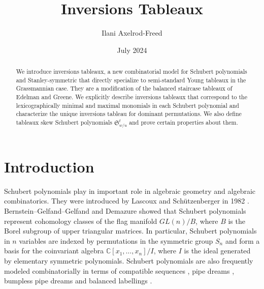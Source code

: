 \documentclass{article}
\title{Inversions Tableaux}
\author{Ilani Axelrod-Freed}
\date{July 2024}
\theoremstyle{definition}
\begin{document}
\newcommand{\Inv}{\mathrm{Inv}}
\newcommand{\IT}{\mathcal{IT}}
\newcommand{\RP}{\mathcal{RP}}
\newcommand{\ID}[1]{\mathcal{ID}_{#1}}

\maketitle

\begin{abstract}
We introduce inversions tableaux, a new combinatorial model for Schubert polynomials and Stanley-symmetric that directly specialize to semi-standard Young tableaux in the Grassmannian case. 
They are a modification of the balanced staircase tableaux of Edelman and Greene. We explicitly describe inversions tableaux that correspond to the lexicographically minimal and maximal monomials in each Schubert polynomial and characterize the unique inversions tableau for dominant permutations. 
We also define tableaux skew Schubert polynomials $\mathfrak{S}^t_{w/u}$ and prove certain properties about them.



\end{abstract}

\section{Introduction}

Schubert polynomials play in important role in algebraic geometry and algebraic combinatorics. They were introduced by Lascoux and Schützenberger in 1982 \cite{LascouxS}. Bernstein--Gelfand--Gelfand \cite{bernstein1973schubert} and Demazure \cite{demazure1974} showed that Schubert polynomials represent cohomology classes of the flag manifold $GL(n)/B$, where $B$ is the Borel subgroup of upper triangular matrices. In particular, Schubert polynomials in $n$ variables are indexed by permutations in the symmetric group $S_n$ and form a basis for the coinvariant algebra $\mathbb{C}[x_1, \dots, x_n]/I$, where $I$ is the ideal generated by elementary symmetric polynomials. Schubert polynomials are also frequently modeled combinatorially in terms of compatible sequences \cite{billey1993some, FOMIN1994196}, pipe dreams \cite{bergeron1993rc, fomin1996yang}, bumpless pipe dreams \cite{lam2021back} and balanced labellings \cite{balancedlabellings}.
\end{document}
